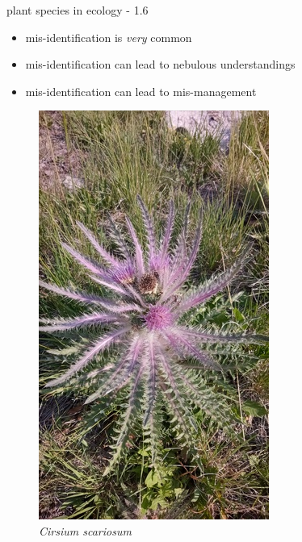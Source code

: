 \documentclass[
  ignorenonframetext,
]{beamer}
\providecommand{\tightlist}{%
  \setlength{\itemsep}{0pt}\setlength{\parskip}{0pt}}
\begin{document}
\begin{frame}{plant species in ecology - 1.6}
\protect\hypertarget{plant-species-in-ecology---1.6}{}
\begin{itemize}
\tightlist
\item
  mis-identification is \emph{very} common
\item
  mis-identification can lead to nebulous understandings
\item
  mis-identification can lead to mis-management
\end{itemize}

\begin{figure}
\centering
\includegraphics{../graphics/pictures/Cirsium_scariosum.resized.jpg}
\caption{\emph{Cirsium scariosum}}
\end{figure}
\end{frame}
\end{document}
